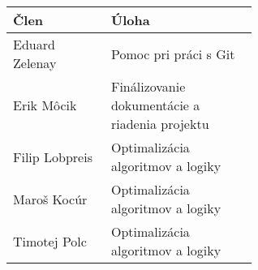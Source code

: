 \begin{table}[H]
    \centering
    \begin{tabular}{|l|p{0.6\linewidth}|}
        \hline
        \textbf{Člen} & \textbf{Úloha} \\
        \hline
        Eduard Zelenay & Pomoc pri práci s Git \\
        \hline
        Erik Môcik & Finálizovanie dokumentácie a riadenia projektu \\
        \hline
        Filip Lobpreis & Optimalizácia algoritmov a logiky \\
        \hline
        Maroš Kocúr & Optimalizácia algoritmov a logiky \\
        \hline
        Timotej Polc & Optimalizácia algoritmov a logiky \\
        \hline
    \end{tabular}
\end{table}
